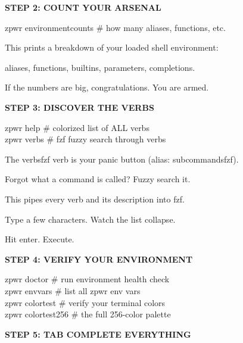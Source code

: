 \documentclass[11pt,a4paper,twoside]{book}
\begin{document}
\vspace{12pt}
{\bfseries\color{neonyellow} STEP 2: COUNT YOUR ARSENAL}\vspace{4pt}

\begin{codebox}
zpwr environmentcounts  \# how many aliases, functions, etc.\\
\end{codebox}

This prints a breakdown of your loaded shell environment:

aliases, functions, builtins, parameters, completions.

If the numbers are big, congratulations. You are armed.


\vspace{12pt}
{\bfseries\color{neonyellow} STEP 3: DISCOVER THE VERBS}\vspace{4pt}

\begin{codebox}
zpwr help               \# colorized list of ALL verbs\\
zpwr verbs     \# fzf fuzzy search through verbs\\
\end{codebox}

The verbsfzf verb is your panic button (alias: subcommandsfzf).

Forgot what a command is called? Fuzzy search it.

This pipes every verb and its description into fzf.

Type a few characters. Watch the list collapse.

Hit enter. Execute.


\vspace{12pt}
{\bfseries\color{neonyellow} STEP 4: VERIFY YOUR ENVIRONMENT}\vspace{4pt}

\begin{codebox}
zpwr doctor             \# run environment health check\\
zpwr envvars            \# list all zpwr env vars\\
zpwr colortest          \# verify your terminal colors\\
zpwr colortest256       \# the full 256-color palette\\
\end{codebox}


\vspace{12pt}
{\bfseries\color{neonyellow} STEP 5: TAB COMPLETE EVERYTHING}\vspace{4pt}
\end{document}
